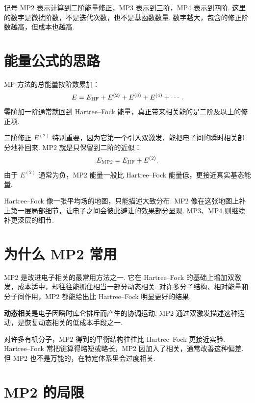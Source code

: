 \documentclass[UTF8,11pt,a4paper,openany]{ctexbook}
\newcommand{\term}[1]{\textbf{#1}}
\begin{document}
\begin{notationbox}
记号 MP2 表示计算到二阶能量修正，MP3 表示到三阶，MP4 表示到四阶. 这里的数字是微扰阶数，不是迭代次数，也不是基函数数量. 数字越大，包含的修正阶数越高，但成本也越高. 
\end{notationbox}

\section{能量公式的思路}

MP 方法的总能量按阶数累加：
\[
E=E_{\rm HF}+E^{(2)}+E^{(3)}+E^{(4)}+\cdots.
\]
零阶加一阶通常就回到 Hartree--Fock 能量，真正带来相关能的是二阶及以上的修正项. 

二阶修正 $E^{(2)}$ 特别重要，因为它第一个引入双激发，能把电子间的瞬时相关部分地补回来. MP2 就是只保留到二阶的近似：
\[
E_{\rm MP2}=E_{\rm HF}+E^{(2)}.
\]
由于 $E^{(2)}$ 通常为负，MP2 能量一般比 Hartree--Fock 能量低，更接近真实基态能量. 

\begin{analogybox}
Hartree--Fock 像一张平均场的地图，只能描述大致分布. MP2 像在这张地图上补上第一层局部细节，让电子之间会彼此避让的效果部分显现. MP3、MP4 则继续补更深层的细节. 
\end{analogybox}

\section{为什么 MP2 常用}

MP2 是改进电子相关的最常用方法之一. 它在 Hartree--Fock 的基础上增加双激发，成本适中，却往往能抓住相当一部分动态相关. 对许多分子结构、相对能量和分子间作用，MP2 都能给出比 Hartree--Fock 明显更好的结果. 

\begin{definitionbox}
\term{动态相关}是电子因瞬时库仑排斥而产生的协调运动. MP2 通过双激发描述这种运动，是恢复动态相关的低成本手段之一. 
\end{definitionbox}

\begin{examplebox}
对许多有机分子，MP2 得到的平衡结构往往比 Hartree--Fock 更接近实验. Hartree--Fock 常把键算得略短或略长，MP2 因加入了相关，通常改善这种偏差. 但 MP2 也不是万能的，在特定体系里会过度相关. 
\end{examplebox}

\section{MP2 的局限}
\end{document}
